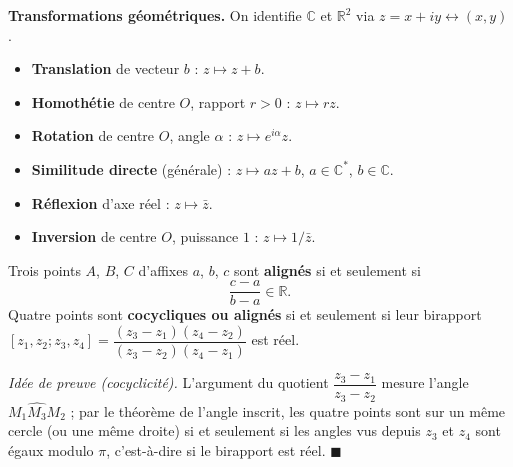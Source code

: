 \begin{tcolorbox}[thmbox]
  \textbf{Transformations géométriques.}\enspace%
  On identifie $\mathbb{C}$ et $\mathbb{R}^2$ via $z = x + iy \leftrightarrow (x,y)$.
  \begin{itemize}
    \item \textbf{Translation} de vecteur $b$ : $z \mapsto z + b$.
    \item \textbf{Homothétie} de centre $O$, rapport $r > 0$ : $z \mapsto rz$.
    \item \textbf{Rotation} de centre $O$, angle $\alpha$ : $z \mapsto e^{i\alpha} z$.
    \item \textbf{Similitude directe} (générale) : $z \mapsto az + b$,
          $a \in \mathbb{C}^*$, $b \in \mathbb{C}$.
    \item \textbf{Réflexion} d'axe réel : $z \mapsto \bar{z}$.
    \item \textbf{Inversion} de centre $O$, puissance $1$ : $z \mapsto 1/\bar{z}$.
  \end{itemize}
\end{tcolorbox}


\begin{tcolorbox}[thmbox]
  Trois points $A$, $B$, $C$ d'affixes $a$, $b$, $c$ sont
  \textbf{alignés} si et seulement si
  \[
    \frac{c - a}{b - a} \in \mathbb{R}.
  \]
  Quatre points sont \textbf{cocycliques ou alignés} si et
  seulement si leur birapport
  $[z_1, z_2; z_3, z_4] = \dfrac{(z_3-z_1)(z_4-z_2)}{(z_3-z_2)(z_4-z_1)}$
  est réel.
\end{tcolorbox}

\begin{mdframed}[style=proofbar]
  \textit{Idée de preuve (cocyclicité).} L'argument du quotient
  $\dfrac{z_3-z_1}{z_3-z_2}$ mesure l'angle $\widehat{M_1 M_3 M_2}$ ; par le
  théorème de l'angle inscrit, les quatre
  points sont sur un même cercle (ou une même droite) si et seulement si les
  angles vus depuis $z_3$ et $z_4$ sont égaux modulo $\pi$, c'est-à-dire si le
  birapport est réel. \hfill$\blacksquare$
\end{mdframed}

\decsep{}


